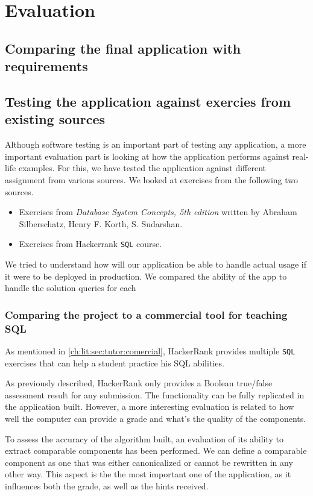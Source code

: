 \chapter{Evaluation}

\section{Comparing the final application with requirements}

\section{Testing the application against exercies from existing sources}
Although software testing is an important part of testing any application, a more important evaluation part is looking at how the application performs against real-life examples. For this, we have tested the application against different assignment from various sources. We looked at exercises from the following two sources.

\begin{itemize}
    \item Exercises from \textit{Database System Concepts, 5th edition} written by Abraham Silberschatz, Henry F. Korth, S. Sudarshan.
    \item Exercises from Hackerrank \texttt{SQL} course.
\end{itemize}

We tried to understand how will our application be able to handle actual usage if it were to be deployed in production. We compared the ability of the app to handle the solution queries for each

\subsection{Comparing the project to a commercial tool for teaching SQL}

As mentioned in \ref{ch:lit:sec:tutor:comercial}, HackerRank provides multiple \texttt{SQL} exercises that can help a student practice his SQL abilities.

As previously described, HackerRank only provides a Boolean true/false assessment result for any submission. The functionality can be fully replicated in the application built. However, a more interesting evaluation is related to how well the computer can provide a grade and what's the quality of the components.

To assess the accuracy of the algorithm built, an evaluation of its ability to extract comparable components has been performed. We can define  a comparable component as one that was either canonicalized or cannot be rewritten in any other way. This aspect is the the most important one of the application, as it influences both the grade, as well as the hints received.

